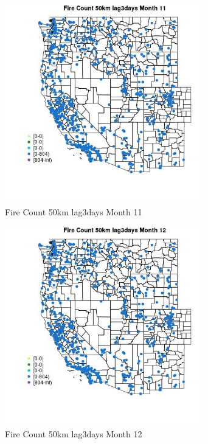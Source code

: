\begin{figure} 
\centering  
\includegraphics[width=0.77\textwidth]{Code_Outputs/Report_ML_input_PM25_Step4_part_f_de_duplicated_aves_prioritize_24hr_obswNAs_MapObsMo11Fire_Count_50km_lag3days.jpg} 
\caption{\label{fig:Report_ML_input_PM25_Step4_part_f_de_duplicated_aves_prioritize_24hr_obswNAsMapObsMo11Fire_Count_50km_lag3days}Fire Count 50km lag3days Month 11} 
\end{figure} 
 

\clearpage 

\begin{figure} 
\centering  
\includegraphics[width=0.77\textwidth]{Code_Outputs/Report_ML_input_PM25_Step4_part_f_de_duplicated_aves_prioritize_24hr_obswNAs_MapObsMo12Fire_Count_50km_lag3days.jpg} 
\caption{\label{fig:Report_ML_input_PM25_Step4_part_f_de_duplicated_aves_prioritize_24hr_obswNAsMapObsMo12Fire_Count_50km_lag3days}Fire Count 50km lag3days Month 12} 
\end{figure} 
 

